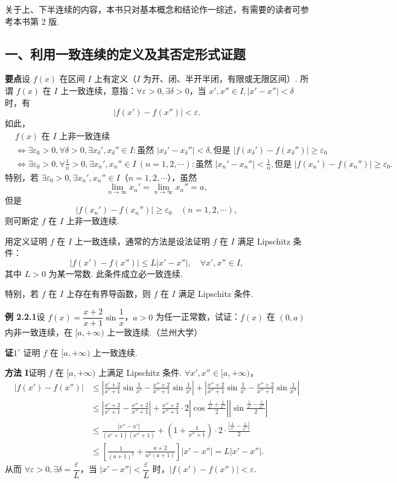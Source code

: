 \documentclass[UTF8,12pt,a4paper,fontset=fandol]{ctexart}
\begin{document}
关于上、下半连续的内容，本书只对基本概念和结论作一综述，有需要的读者可参考本书第 2 版.

\subsection*{一、利用一致连续的定义及其否定形式证题}

\noindent\textbf{要点}\quad 设 $f(x)$ 在区间 $I$ 上有定义（$I$ 为开、闭、半开半闭，有限或无限区间）. 所谓 $f(x)$ 在 $I$ 上一致连续，意指：$\forall\varepsilon>0,\exists\delta>0$，当 $x',x''\in I,|x'-x''|<\delta$ 时，有
\[
  |f(x')-f(x'')|<\varepsilon.
\]
如此，
\[
\begin{aligned}
&f(x)\text{ 在 }I\text{ 上非一致连续}\\
&\Leftrightarrow \exists\varepsilon_0>0,\forall\delta>0,\exists x_\delta',x_\delta''\in I:
  \text{虽然 }|x_\delta'-x_\delta''|<\delta,\text{但是 }|f(x_\delta')-f(x_\delta'')|\ge\varepsilon_0\\
&\Leftrightarrow \exists\varepsilon_0>0,\forall\frac1n>0,\exists x_n',x_n''\in I\ (n=1,2,\cdots):
  \text{虽然 }|x_n'-x_n''|<\frac1n,\text{但是 }|f(x_n')-f(x_n'')|\ge\varepsilon_0.
\end{aligned}
\]
特别，若 $\exists\varepsilon_0>0,\exists x_n',x_n''\in I$（$n=1,2,\cdots$），虽然
\[
  \lim_{n\to\infty}x_n'=\lim_{n\to\infty}x_n''=a,
\]
但是
\[
  |f(x_n')-f(x_n'')|\ge\varepsilon_0\quad(n=1,2,\cdots),
\]
则可断定 $f$ 在 $I$ 上非一致连续.

用定义证明 $f$ 在 $I$ 上一致连续，通常的方法是设法证明 $f$ 在 $I$ 满足 Lipschitz 条件：
\[
  |f(x')-f(x'')|\le L|x'-x''|,\quad \forall x',x''\in I,
\]
其中 $L>0$ 为某一常数. 此条件成立必一致连续.

特别，若 $f$ 在 $I$ 上存在有界导函数，则 $f$ 在 $I$ 满足 Lipschitz 条件.

\noindent\textbf{例 2.2.1}\quad 设 $f(x)=\dfrac{x+2}{x+1}\sin\dfrac1x$，$a>0$ 为任一正常数，试证：$f(x)$ 在 $(0,a)$ 内非一致连续，在 $[a,+\infty)$ 上一致连续.（兰州大学）

\noindent\textbf{证}\quad $1^\circ$ 证明 $f$ 在 $[a,+\infty)$ 上一致连续.

\noindent\textbf{方法 I}\quad 证明 $f$ 在 $[a,+\infty)$ 上满足 Lipschitz 条件. $\forall x',x''\in[a,+\infty)$，
\[
\begin{aligned}
|f(x')-f(x'')|
&\le \left|\frac{x'+2}{x'+1}\sin\frac1{x'}-\frac{x''+2}{x''+1}\sin\frac1{x'}\right|
 +\left|\frac{x''+2}{x''+1}\sin\frac1{x'}-\frac{x''+2}{x''+1}\sin\frac1{x''}\right|\\
&\le \left|\frac{x'+2}{x'+1}-\frac{x''+2}{x''+1}\right|
 +\frac{x''+2}{x''+1}\cdot2
 \left|\cos\frac{\frac1{x'}+\frac1{x''}}2\right|
 \left|\sin\frac{\frac1{x'}-\frac1{x''}}2\right|\\
&\le \frac{|x''-x'|}{(x'+1)(x''+1)}
 +\left(1+\frac1{x''+1}\right)\cdot2\cdot\frac{\left|\frac1{x'}-\frac1{x''}\right|}{2}\\
&\le \left[\frac1{(a+1)^2}+\frac{a+2}{a^2(a+1)}\right]|x'-x''|
 =L|x'-x''|.
\end{aligned}
\]
从而 $\forall\varepsilon>0,\exists\delta=\dfrac\varepsilon L$，当 $|x'-x''|<\dfrac\varepsilon L$ 时，$|f(x')-f(x'')|<\varepsilon$.
\end{document}
